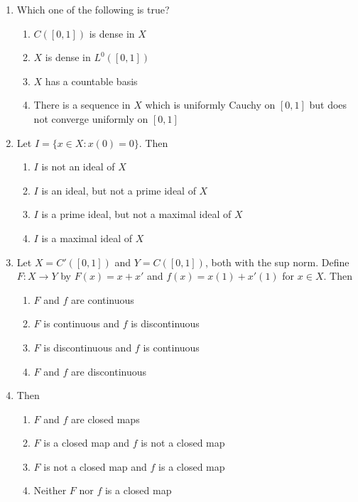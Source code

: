 \documentclass[journal]{IEEEtran}
\numberwithin{equation}{enumi}
\numberwithin{figure}{enumi}
\begin{document}
\begin{enumerate}
\item
Which one of the following is true?
\hfill{}

\begin{enumerate}
    \item $C([0,1])$ is dense in $X$
    \item $X$ is dense in $L^0([0,1])$
    \item $X$ has a countable basis
    \item There is a sequence in $X$ which is uniformly Cauchy on $[0,1]$ but does not converge uniformly on $[0,1]$
\end{enumerate}


\item
Let $I = \{x \in X : x(0) = 0\}$. Then
\hfill{}

\begin{enumerate}
    \item $I$ is not an ideal of $X$
    \item $I$ is an ideal, but not a prime ideal of $X$
    \item $I$ is a prime ideal, but not a maximal ideal of $X$
    \item $I$ is a maximal ideal of $X$
\end{enumerate}


\item
Let $X = C'([0,1])$ and $Y = C([0,1])$, both with the sup norm. Define $F: X \to Y$ by $F(x) = x + x'$ and $f(x) = x(1) + x'(1)$ for $x \in X$. Then
\hfill{}
\begin{multicols}{2}
\begin{enumerate}
    \item $F$ and $f$ are continuous
    \item $F$ is continuous and $f$ is discontinuous
    \item $F$ is discontinuous and $f$ is continuous
    \item $F$ and $f$ are discontinuous
\end{enumerate}
\end{multicols}

\item
Then
\hfill{}
\begin{multicols}{2}
\begin{enumerate}
    \item $F$ and $f$ are closed maps
    \item $F$ is a closed map and $f$ is not a closed map
    \item $F$ is not a closed map and $f$ is a closed map
    \item Neither $F$ nor $f$ is a closed map
\end{enumerate}
\end{multicols}


\end{enumerate}
\end{document}
